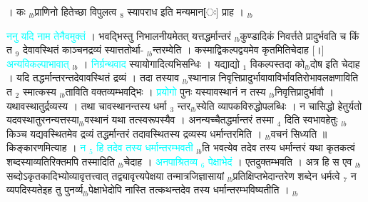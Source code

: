 \documentclass[article,12pt,a4paper]{memoir}%
\newcommand{\quotelemma}[1]{\textcolor{cyan}{#1}}
\newcounter{parCount}
\begin{document}
। कः {\tiny $_{lb}$}प्राणिनो हितेच्छा विपुलत्व {\tiny $_{8}$} स्यापराध इति मन्यमान[ः] प्राह ।
	{}
	\pend%
      {\tiny $_{lb}$}

	  
	  \pstart \leavevmode%
	\hphantom{.}\quotelemma{ननु यदि नाम तेनैवमुक्तं} । भवद्भिस्तु निभालनीयमेतत् यत्तद्धर्मान्तरं {\tiny $_{lb}$}कुण्डादिकं निवर्त्तते प्रादुर्भवति च किं त {\tiny $_{9}$} \leavevmode{} देवावस्थितं काञ्चनद्रव्यं स्यात्ततोर्था- {\tiny $_{lb}$}न्तरम्वेति । कस्माद्विकल्पद्वयमेव कृतमितिचेदाह [।] \quotelemma{अन्यविकल्पाभावात्} {\tiny $_{lb}$} \cite[5a8]{vn-msN} । \quotelemma{निर्ग्रन्थवाद} स्यायोगादित्यभिसन्धिः । यद्याद्यो {\tiny $_{1}$} विकल्पस्तदा को{\tiny $_{lb}$}दोष इति चेदाह । यदि तद्धर्मान्तरन्तदेवावस्थितं द्रव्यं \cite[5a8]{vn-msN} । तदा तस्याव {\tiny $_{lb}$}स्थानान्न निवृत्तिप्रादुर्भावावाविर्भावतिरोभावलक्षणाविति त {\tiny $_{2}$} स्मात्कस्य {\tiny $_{lb}$}ताविति वक्तव्यम्भवद्भिः । \quotelemma{प्रयोगो} पुनः यस्यावस्थानं न तस्य {\tiny $_{lb}$}निवृत्तिप्रादुर्भावौ । यथावस्थातुर्द्रव्यस्य । तथा चावस्थानन्तस्य धर्मा {\tiny $_{3}$} न्तर{\tiny $_{lb}$}स्येति व्यापकविरुद्धोपलब्धिः । न चासिद्धो हेतुर्यतो यदवस्थातुरनन्यत्तस्या{\tiny $_{lb}$}वस्थानं यथा तत्स्वरूपस्यैव । अनन्यच्चैतद्धर्मान्तरं तस्मा {\tiny $_{4}$} दिति स्वभावहेतुः {\tiny $_{lb}$}किञ्च यद्यवस्थितमेव द्रव्यं तद्धर्मान्तरं तदावस्थितस्य द्रव्यस्य धर्मान्तरमिति । {\tiny $_{lb}$}वचनं सिध्यति ॥ किङ्कारणमित्याह । \quotelemma{न {\tiny $_{5}$} हि तदेव तस्य धर्मान्तरम्भवती} \cite[5a9]{vn-msN} {\tiny $_{lb}$}ति भवत्येव तदेव तस्य धर्मान्तरं यथा कृतकत्वं शब्दस्याव्यतिरिक्तमपि तस्मादिति {\tiny $_{lb}$}चेदाह । \quotelemma{अनपाश्रितव्य {\tiny $_{6}$} पेक्षाभेदं} \cite[5a9]{vn-msN} । एतदुक्तम्भवति । अत्र हि स एव {\tiny $_{lb}$}सब्दोऽकृतकादिभ्योव्यावृत्तत्त्वात् तद्व्यावृत्त्यपेक्षया तन्मात्रजिज्ञासायां {\tiny $_{lb}$}प्रतिक्षिप्तभेदान्तरेण शब्देन धर्मत्वे {\tiny $_{7}$} न व्यपदिस्यतेइह तु पुनर्व्य{\tiny $_{lb}$}पेक्षाभेदोपि नास्ति तत्कथन्तदेव तस्य धर्मान्तरम्भविष्यतीति ।
	{}
	\pend%
      {\tiny $_{lb}$}
\end{document}
